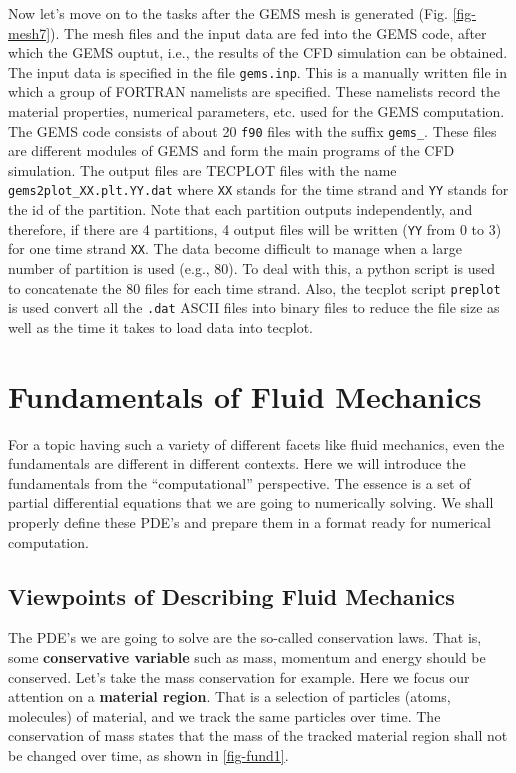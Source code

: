 \documentclass[11pt, letterpaper]{report}
\begin{document}
Now let's move on to the tasks after the GEMS mesh is generated (Fig. \ref{fig-mesh7}). The mesh
files and the input data are fed into the GEMS code, after which the GEMS ouptut, i.e., the results
of the CFD simulation can be obtained. The input data is specified in the file \verb+gems.inp+. This
is a manually written file in which a group of FORTRAN namelists are specified. These namelists
record the material properties, numerical parameters, etc. used for the GEMS computation. The GEMS
code consists of about 20 \verb+f90+ files with the suffix \verb+gems_+. These files are different
modules of GEMS and form the main programs of the CFD simulation. The output files are TECPLOT files
with the name \verb+gems2plot_XX.plt.YY.dat+ where \verb+XX+ stands for the time strand and
\verb+YY+ stands for the id of the partition. Note that each partition outputs independently, and
therefore, if there are 4 partitions, 4 output files will be written (\verb+YY+ from 0 to 3) for one
time strand \verb+XX+. The data become difficult to manage when a large number of partition is used
(e.g., 80). To deal with this, a python script is used to concatenate the 80 files for each time
strand. Also, the tecplot script \verb+preplot+ is used convert all the \verb+.dat+ ASCII files into
binary files to reduce the file size as well as the time it takes to load data into tecplot.

\chapter{Fundamentals of Fluid Mechanics}

For a topic having such a variety of different facets like fluid mechanics, even the fundamentals
are different in different contexts. Here we will introduce the fundamentals from the
``computational'' perspective. The essence is a set of partial differential equations that we are
going to numerically solving. We shall properly define these PDE's and prepare them in a format ready
for numerical computation. 
\paraspace

\section{Viewpoints of Describing Fluid Mechanics}

The PDE's we are going to solve are the so-called conservation laws. That is, some {\bf conservative
variable} such as mass, momentum and energy should be conserved. Let's take the mass
conservation for example. Here we focus our attention on a {\bf material region}. That is a
selection of particles (atoms, molecules) of material, and we track the same particles over time.
The conservation of mass states that the mass of the tracked material region shall not be changed
over time, as shown in \ref{fig-fund1}.
\end{document}
